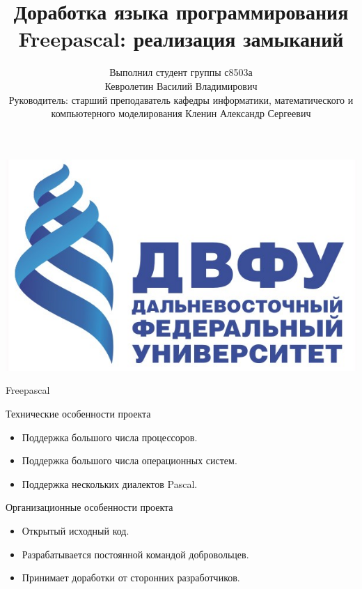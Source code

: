 \documentclass[roman,12pt]{beamer}
\begin{document}
\title{Доработка языка программирования Freepascal: реализация замыканий}  
\author{Выполнил студент группы с8503а \\ Кевролетин Василий
  Владимирович\\ Руководитель: старший преподаватель кафедры
  информатики, математического и компьютерного моделирования Кленин
  Александр Сергеевич}

\begin{frame}
\begin{center}
\includegraphics[scale=0.15]{logo.jpeg}
\end{center}
\maketitle

\end{frame}

\begin{frame}{Freepascal}
  \begin{block}{Технические особенности проекта}
    \begin{itemize}
    \item Поддержка большого числа процессоров.
    \item Поддержка большого числа операционных систем.
    \item Поддержка нескольких диалектов Pascal.
    \end{itemize}
  \end{block}
  \begin{block}{Организационные особенности проекта}
    \begin{itemize}
    \item Открытый исходный код.
    \item Разрабатывается постоянной командой добровольцев.
    \item Принимает доработки от сторонних разработчиков.
    \end{itemize}  
  \end{block}
\end{frame}
\end{document}
